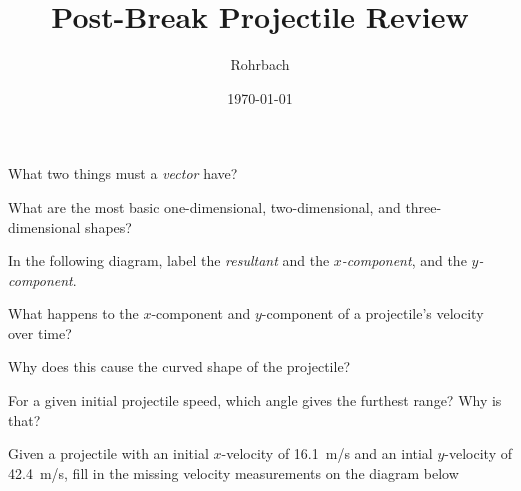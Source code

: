 \documentclass[10pt]{exam}
\title{Post-Break Projectile Review}
\author{Rohrbach}
\date{\today}
\begin{document}
\maketitle

\begin{questions}
  
  \question 
    What two things must a \emph{vector} have?
    \vs
  
  \question
    What are the most basic one-dimensional, two-dimensional, and three-dimensional shapes?
    \vs

  \question 
    In the following diagram, label the \emph{resultant} and the \emph{$x$-component}, and the \emph{$y$-component}.

    \vspace{2em}
    \begin{center}
    \end{center}
    \vspace{2em}

  \question 
    What happens to the $x$-component and $y$-component of a projectile's velocity over time?  
    \vs
    
    
  \question
    Why does this cause the curved shape of the projectile?
    \vs

  \question
    For a given initial projectile speed, which angle gives the furthest range?  Why is that?
    \vs

  \pagebreak

  \question
    \def\velx{16.1}
    \def\vely{42.4}
    Given a projectile with an initial $x$-velocity of \velx~m/s and an intial $y$-velocity of \vely~m/s, fill in the missing velocity measurements on the diagram below

    \vspace{1em}


\end{questions}
\end{document}
